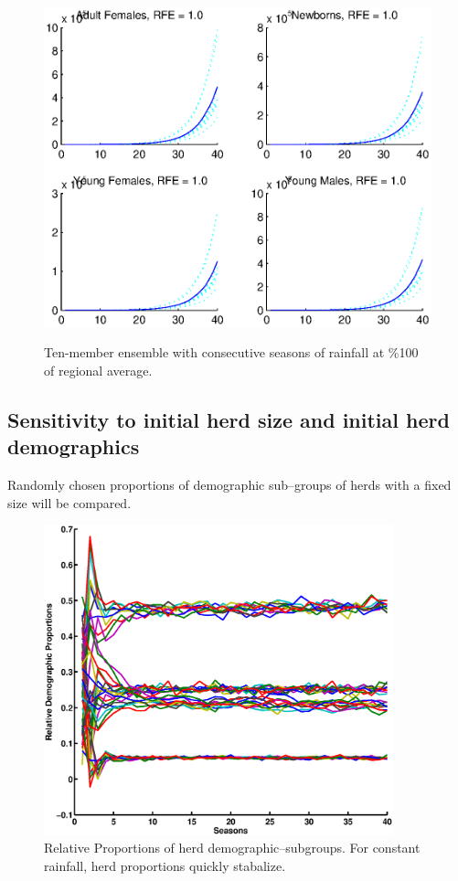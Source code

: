 \documentclass[fleqn, letterpaper]{amsart}
\begin{document}
\begin{figure}
\includegraphics[width=\textwidth]{rgeneral10}
\label{rgeneral10}
\caption{Ten-member ensemble with consecutive seasons of rainfall at \%100 of regional average.}
\end{figure}

\subsection{Sensitivity to initial herd size and initial herd demographics}
Randomly chosen proportions of demographic sub--groups of herds with a fixed size will be compared.
\begin{figure}
\includegraphics[width=0.9\textwidth]{relprop}
\caption{Relative Proportions of herd demographic--subgroups. For constant rainfall, herd proportions quickly stabalize.}
\end{figure}
\end{document}
